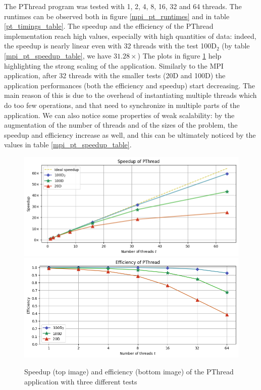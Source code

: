\documentclass[11pt, journal]{IEEEtran}
\begin{document}
The PThread program was tested with 1, 2, 4, 8, 16, 32 and 64 threads. The runtimes can be observed both in figure \ref{mpi_pt_runtimes} and in table \ref{pt_timings_table}. The speedup and the efficiency of the PThread implementation reach high values, especially with high quantities of data: indeed, the speedup is nearly linear even with 32 threads with the test 100D$_2$ (by table \ref{mpi_pt_speedup_table}, we have $31.28\times$) The plots in figure \ref{pt_speedup_eff} help highlighting the strong scaling of the application. Similarly to the MPI application, after 32 threads with the smaller tests (20D and 100D) the application performances (both the efficiency and speedup) start decreasing. The main reason of this is due to the overhead of instantiating multiple threads which do too few operations, and that need to synchronize in multiple parts of the application. We can also notice some properties of weak scalability: by the augmentation of the number of threads and of the sizes of the problem, the speedup and efficiency increase as well, and this can be ultimately noticed by the values in table \ref{mpi_pt_speedup_table}.

\begin{figure}
    \label{pt_speedup_eff}
    \centering
    \includegraphics[width=\linewidth]{imgs/pt_speedup.png}
    \includegraphics[width=\linewidth]{imgs/pt_efficiency.png}
    \caption{Speedup (top image) and efficiency (bottom image) of the PThread application with three different tests}
\end{figure}
\end{document}
